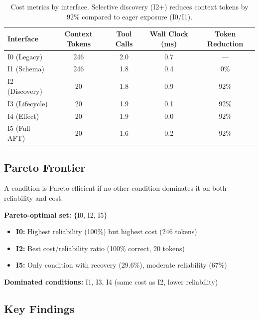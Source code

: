 \begin{table}[h]
\centering
\begin{tabular}{lcccc}
\hline
\textbf{Interface} & \textbf{Context Tokens} & \textbf{Tool Calls} & \textbf{Wall Clock (ms)} & \textbf{Token Reduction} \\
\hline
I0 (Legacy) & 246 & 2.0 & 0.7 & --- \\
I1 (Schema) & 246 & 1.8 & 0.4 & 0\% \\
I2 (Discovery) & 20 & 1.8 & 0.9 & 92\% \\
I3 (Lifecycle) & 20 & 1.9 & 0.1 & 92\% \\
I4 (Effect) & 20 & 1.9 & 0.0 & 92\% \\
I5 (Full AFT) & 20 & 1.6 & 0.2 & 92\% \\
\hline
\end{tabular}
\caption{Cost metrics by interface. Selective discovery (I2+) reduces context tokens by 92\% compared to eager exposure (I0/I1).}
\label{tab:cost_by_interface}
\end{table}

\subsection{Pareto Frontier}

A condition is Pareto-efficient if no other condition dominates it on both reliability and cost.

\textbf{Pareto-optimal set:} $\{$I0, I2, I5$\}$

\begin{itemize}
    \item \textbf{I0:} Highest reliability (100\%) but highest cost (246 tokens)
    \item \textbf{I2:} Best cost/reliability ratio (100\% correct, 20 tokens)
    \item \textbf{I5:} Only condition with recovery (29.6\%), moderate reliability (67\%)
\end{itemize}

\textbf{Dominated conditions:} I1, I3, I4 (same cost as I2, lower reliability)

\subsection{Key Findings}

